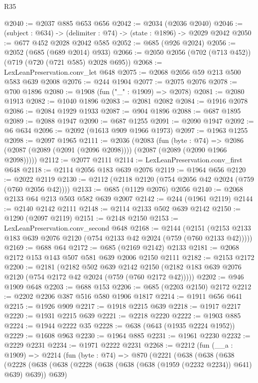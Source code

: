 \begin{lexlean}{R35}
\begin{coremodule}
@2040 := @2037 @885 @653 @656
@2042 := @2034 (@2036 @2040)
@2046 := (subject : @634) -> (delimiter : @74) -> (state : @1896) -> @2029 @2042
@2050 := @677 @452 @2028 @2042 @585
@2052 := @685 (@926 @2024)
@2056 := @2052 (@685 (@689 @2014) @933)
@2066 := @2050 @2056 (@702 (@713 @452)) (@719 (@720 (@721 @585) @2028 @695))
@2068 := LexLeanPreservation.conv_let @648
@2075 := @2068 @2056 @59 @213 @500 @583 @639 @2008
@2076 := @244 @1904
@2077 := @2075 @2076
@2078 := @700 @1896
@2080 := @1908 (fun ("_" : @1909) => @2078)
@2081 := @2080 @1913
@2082 := @1040 @1896
@2083 := @2081 @2082
@2084 := @1916 @2078
@2086 := @2084 @1929 @1933
@2087 := @904 @1896
@2088 := @687 @1895
@2089 := @2088 @1947
@2090 := @687 @1255
@2091 := @2090 @1947
@2092 := @6 @634
@2096 := @2092 (@1613 @909 @1966 @1973)
@2097 := @1963 @1255
@2098 := @2097 @1965
@2111 := @2036
    (@2083
      (fun (byte : @74) =>
      @2086 (@2087 (@2089 (@2091 (@2096 @2098)))) (@2087 (@2089 (@2090 @1966 @2098)))))
@2112 := @2077 @2111
@2114 := LexLeanPreservation.conv_first @648
@2118 := @2114 @2056 @183 @639 @2076
@2119 := @1964 @656
@2120 := @2022 @2119
@2130 := @2112 (@2118 @2120 (@754 @2056 @42 @2024 (@759 (@760 @2056 @42))))
@2133 := @685 (@1129 @2076) @2056
@2140 := @2068 @2133 @64 @213 @503 @582 @639 @2007
@2142 := @244 (@1961 @2119)
@2144 := @2140 @2142 @2111
@2148 := @2114 @2133 @502 @639 @2142
@2150 := @1290 (@2097 @2119)
@2151 := @2148 @2150
@2153 := LexLeanPreservation.conv_second @648
@2168 := @2144
    (@2151 (@2153 @2133 @183 @639 @2076 @2120 (@754 @2133 @42 @2024 (@759 (@760 @2133 @42)))))
@2169 := @688 @64
@2172 := @685 (@2169 @2142) @2133
@2181 := @2068 @2172 @153 @143 @507 @581 @639 @2006 @2150 @2111
@2182 := @2153 @2172
@2200 := @2181
    (@2182
      @502
      @639
      @2142
      @2150
      (@2182 @183 @639 @2076 @2120 (@754 @2172 @42 @2024 (@759 (@760 @2172 @42)))))
@2202 := @946 @1909 @648
@2203 := @688 @153
@2206 := @685 (@2203 @2150) @2172
@2212 := @2202 @2206 @387 @516 @580 @1906 @1817
@2214 := @1911 @656 @641
@2215 := @1926 @909
@2217 := @1918 @2215 @639
@2218 := @1917 @2217
@2220 := @1931 @2215 @639
@2221 := @2218 @2220
@2222 := @1903 @885
@2224 := @1944 @2222 @35
@2228 := @638 (@643 (@1935 @2224 @1952))
@2229 := @1608 @963
@2230 := @1964 @885
@2231 := @1961 @2230
@2232 := @2229 @2231
@2234 := @1971 @2222 @2231
@2268 := @2212
    (fun (__a : @1909) =>
    @2214
      (fun (byte : @74) =>
      @870
        (@2221
          (@638
            (@638
              (@638
                (@2228
                  (@638
                    (@638 (@2228 (@638 (@638 (@638 (@1959 (@2232 @2234)) @641) @639) @639)) @639)

\end{coremodule}
\end{lexlean}
